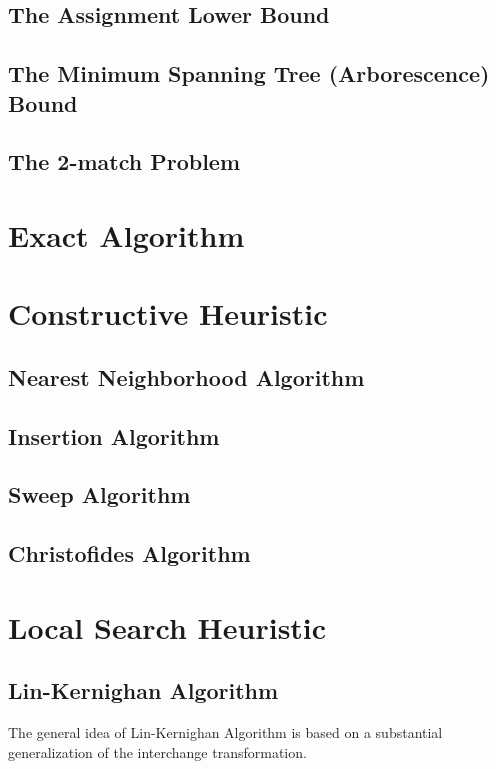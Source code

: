 				\subsection{The Assignment Lower Bound}

				\subsection{The Minimum Spanning Tree (Arborescence) Bound}

				\subsection{The 2-match Problem}

			\section{Exact Algorithm}

			\section{Constructive Heuristic}
				\subsection{Nearest Neighborhood Algorithm}

				\subsection{Insertion Algorithm}

				\subsection{Sweep Algorithm}

				\subsection{Christofides Algorithm}

			\section{Local Search Heuristic}
				\subsection{Lin-Kernighan Algorithm}
					The general idea of Lin-Kernighan Algorithm is based on a substantial generalization of the interchange transformation.


